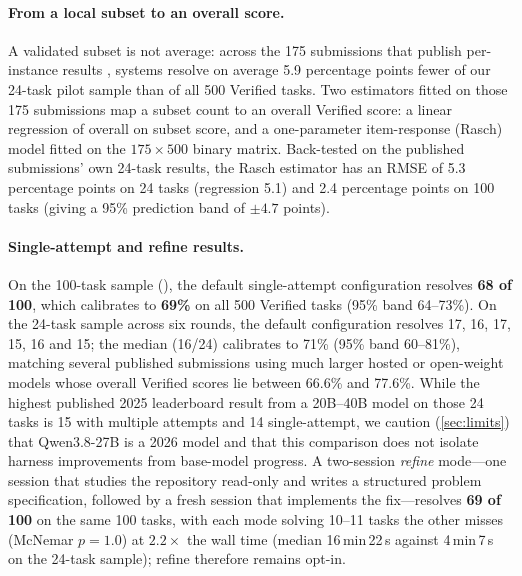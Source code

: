 \documentclass[11pt]{article}
\begin{document}
\paragraph{From a local subset to an overall score.} A validated subset is not average: across the
175 submissions that publish per-instance results \cite{swebenchexperiments}, systems resolve on
average 5.9 percentage points fewer of our 24-task pilot sample than of all 500 Verified tasks. Two
estimators fitted on those 175 submissions map a subset count to an overall Verified score: a
linear regression of overall on subset score, and a one-parameter item-response (Rasch) model
fitted on the $175\times 500$ binary matrix. Back-tested on the published submissions'
own 24-task results, the Rasch estimator has an RMSE of 5.3 percentage points on 24 tasks
(regression 5.1) and 2.4 percentage points on 100 tasks (giving a 95\% prediction band of
$\pm 4.7$ points).

\paragraph{Single-attempt and refine results.} On the 100-task sample (), the
default single-attempt configuration resolves \textbf{68 of 100}, which calibrates to \textbf{69\%}
on all 500 Verified tasks (95\% band 64--73\%). On the 24-task sample across six rounds, the
default configuration resolves 17, 16, 17, 15, 16 and 15; the median (16/24) calibrates to 71\%
(95\% band 60--81\%), matching several published submissions using much larger hosted or open-weight
models whose overall Verified scores lie between 66.6\% and 77.6\%. While the highest published
2025 leaderboard result from a 20B--40B model on those 24 tasks is 15 with multiple attempts and 14
single-attempt, we caution (\cref{sec:limits}) that Qwen3.8-27B is a 2026 model and that this
comparison does not isolate harness improvements from base-model progress. A two-session
\emph{refine} mode—one session that studies the repository read-only and writes a structured
problem specification, followed by a fresh session that implements the fix—resolves \textbf{69 of
100} on the same 100 tasks, with each mode solving 10--11 tasks the other misses (McNemar
$p = 1.0$) at $2.2\times$ the wall time (median 16\,min\,22\,s against 4\,min\,7\,s on the 24-task
sample); refine therefore remains opt-in.
\end{document}
